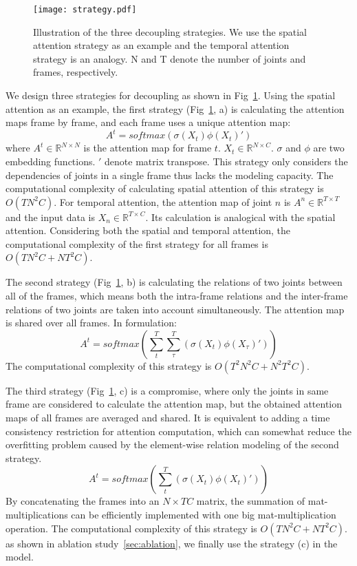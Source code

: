 \documentclass[runningheads]{llncs}
\begin{document}
\begin{figure}[tp]
    \centering
    \texttt{[image: strategy.pdf]}
    \caption{Illustration of the three decoupling strategies. We use the spatial attention strategy as an example and the temporal attention strategy is an analogy. N and T denote the number of joints and frames, respectively.}
    \label{fig:strategy}
\end{figure}{}

We design three strategies for decoupling as shown in Fig~\ref{fig:strategy}. 
Using the spatial attention as an example, the first strategy (Fig~\ref{fig:strategy}, a) is calculating the attention maps frame by frame, and each frame uses a unique attention map:
\begin{equation}
    A^t = softmax(\sigma(X_t)\phi(X_t)')
\end{equation}{}
where $A^t\in\mathbb{R}^{N\times N}$ is the attention map for frame $t$. $X_t\in\mathbb{R}^{N\times C}$. $\sigma$ and $\phi$ are two embedding functions. $'$ denote matrix transpose. 
This strategy only considers the dependencies of joints in a single frame thus lacks the modeling capacity. 
The computational complexity of calculating spatial attention of this strategy is $O(TN^2C)$. 
For temporal attention, the attention map of joint $n$ is $A^n\in\mathbb{R}^{T\times T}$ and the input data is $X_n\in\mathbb{R}^{T\times C}$. 
Its calculation is analogical with the spatial attention. 
Considering both the spatial and temporal attention, the computational complexity of the first strategy for all frames is $O(TN^2C+NT^2C)$.


The second strategy (Fig~\ref{fig:strategy}, b) is calculating the relations of two joints between all of the frames, which means both the intra-frame relations and the inter-frame relations of two joints are taken into account simultaneously. 
The attention map is shared over all frames. 
In formulation: 
\begin{equation}
    A^t = softmax(\sum_t^T\sum_\tau^T(\sigma(X_t)\phi(X_\tau)'))
\end{equation}{}
The computational complexity of this strategy is $O(T^2N^2C+N^2T^2C)$.


The third strategy (Fig~\ref{fig:strategy}, c) is a compromise, where only the joints in same frame are considered to calculate the attention map, but the obtained attention maps of all frames are averaged and shared.
It is equivalent to adding a time consistency restriction for attention computation, which can somewhat reduce the overfitting problem caused by the element-wise relation modeling of the second strategy.
\begin{equation}
    A^t = softmax(\sum_t^T(\sigma(X_t)\phi(X_t)'))
\end{equation}{}
By concatenating the frames into an $N\times TC$ matrix, the summation of mat-multiplications can be efficiently implemented with one big mat-multiplication operation. 
The computational complexity of this strategy is $O(TN^2C+NT^2C)$.
as shown in ablation study~\ref{sec:ablation}, we finally use the strategy (c) in the model.
\end{document}
